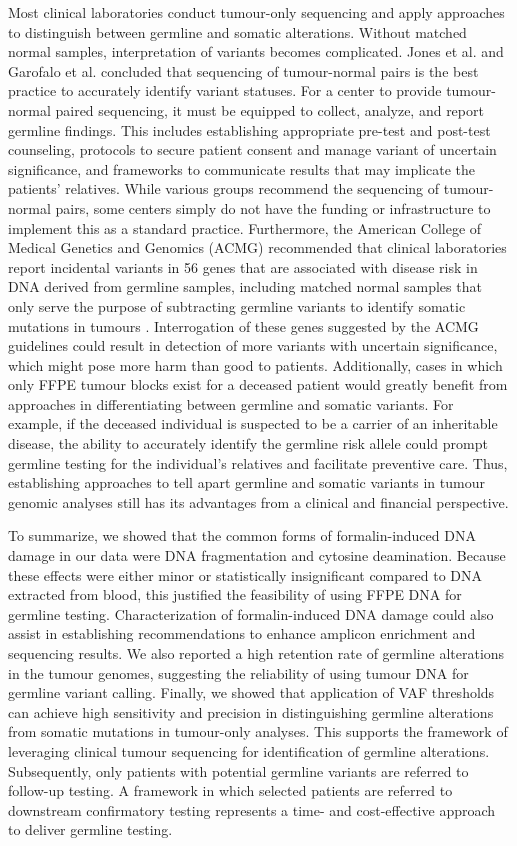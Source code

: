 Most clinical laboratories conduct tumour-only sequencing and apply approaches to distinguish between germline and somatic alterations. Without matched normal samples, interpretation of variants becomes complicated. Jones et al. \cite{Jones2015a} and Garofalo et al. \cite{Garofalo2016} concluded that sequencing of tumour-normal pairs is the best practice to accurately identify variant statuses. For a center to provide tumour-normal paired sequencing, it must be equipped to collect, analyze, and report germline findings. This includes establishing appropriate pre-test and post-test counseling, protocols to secure patient consent and manage variant of uncertain significance, and frameworks to communicate results that may implicate the patients' relatives. While various groups recommend the sequencing of tumour-normal pairs, some centers simply do not have the funding or infrastructure to implement this as a standard practice. Furthermore, the American College of Medical Genetics and Genomics (\acs{ACMG}) recommended that clinical laboratories report incidental variants in 56 genes that are associated with disease risk in DNA derived from germline samples, including matched normal samples that only serve the purpose of subtracting germline variants to identify somatic mutations in tumours \cite{Green2013}. Interrogation of these genes suggested by the ACMG guidelines could result in detection of more variants with uncertain significance, which might pose more harm than good to patients. Additionally, cases in which only FFPE tumour blocks exist for a deceased patient would greatly benefit from approaches in differentiating between germline and somatic variants. For example, if the deceased individual is suspected to be a carrier of an inheritable disease, the ability to accurately identify the germline risk allele could prompt germline testing for the individual's relatives and facilitate preventive care. Thus, establishing approaches to tell apart germline and somatic variants in tumour genomic analyses still has its advantages from a clinical and financial perspective.

To summarize, we showed that the common forms of formalin-induced DNA damage in our data were DNA fragmentation and cytosine deamination. Because these effects were either minor or statistically insignificant compared to DNA extracted from blood, this justified the feasibility of using FFPE DNA for germline testing. Characterization of formalin-induced DNA damage could also assist in establishing recommendations to enhance amplicon enrichment and sequencing results. We also reported a high retention rate of germline alterations in the tumour genomes, suggesting the reliability of using tumour DNA for germline variant calling. Finally, we showed that application of VAF thresholds can achieve high sensitivity and precision in distinguishing germline alterations from somatic mutations in tumour-only analyses. This supports the framework of leveraging clinical tumour sequencing for identification of germline alterations. Subsequently, only patients with potential germline variants are referred to follow-up testing. A framework in which selected patients are referred to downstream confirmatory testing represents a time- and cost-effective approach to deliver germline testing.

